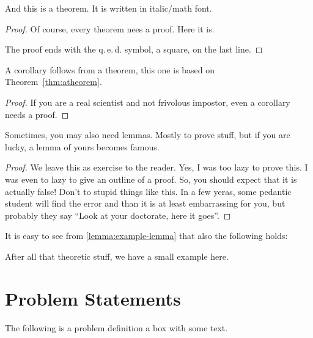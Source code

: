 \begin{theorem}\label{thm:atheorem}
  And this is a theorem. It is written in italic/math font.
\end{theorem}
\begin{proof}
  Of course, every theorem nees a proof. Here it is.
  
  The proof ends with the q.\,e.\,d. symbol, a square, on the last line.
\end{proof}

\begin{corollary}
  A corollary follows from a theorem, this one is based on Theorem~\ref{thm:atheorem}.
\end{corollary}
\begin{proof}
  If you are a real scientist and not frivolous impostor, even a corollary needs a proof.
\end{proof}

\begin{lemma}\label{lemma:example-lemma}
  Sometimes, you may also need lemmas. Mostly to prove stuff, but if you are lucky, a lemma of yours becomes famous. \cite{Zorn1935}
\end{lemma}
\begin{proof}
  We leave this as exercise to the reader. Yes, I was too lazy to prove this. I was even to lazy to give an outline of a proof. So, you should expect that it is actually false! Don't to stupid things like this. In a few yeras, some pedantic student will find the error and than it is at least embarrassing for you, but probably they say ``Look at your doctorate, here it goes''.
\end{proof}

\begin{observation}
  It is easy to see from \ref{lemma:example-lemma} that also the following holds:
\end{observation}

\begin{example}
  After all that theoretic stuff, we have a small example here. 
\end{example}




\section{Problem Statements}

The following is a problem definition \ie a box with some text.


